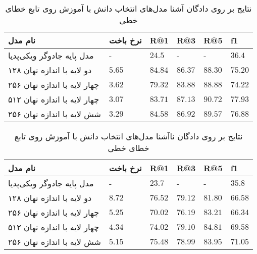 \begin{table}[h]
	\caption{نتایج بر روی دادگان آشنا مدل‌های انتخاب دانش با آموزش روی تابع خطای خطی }
	\centering
	\label{table:knowledge:lin:seen}
	\begin{tabular}{|l|l|l|l|l|l|}
		\hline
		نام مدل                      & نرخ باخت        & R@1              & R@3              & R@5              & f1               \\ \hline
		مدل پایه جادوگر ویکی‌پدیا    & -               & $24.5$           & -                & -                & $36.4$           \\ \hline
		دو لایه با اندازه نهان ۱۲۸   & $5.65$          & $\mathbf{84.84}$ & $86.37$          & $88.30$          & $75.20$          \\ \hline
		چهار لایه با اندازه نهان ۲۵۶ & $3.62$          & $79.32$          & $83.88$          & $88.88$          & $74.22$          \\ \hline
		چهار لایه با اندازه نهان ۵۱۲ & $\mathbf{3.07}$ & $83.71$          & $\mathbf{87.13}$ & $\mathbf{90.72}$ & $\mathbf{77.93}$ \\ \hline
		شش لایه با اندازه نهان ۲۵۶   & $3.29$          & $84.58$          & $86.92$          & $89.57$          & $76.88$          \\ \hline
	\end{tabular}
\end{table}

\begin{table}[h]
	\caption{نتایج بر روی دادگان ناآشنا مدل‌های انتخاب دانش با آموزش روی تابع خطای خطی }
	\centering
	\label{table:knowledge:lin:unseen}
	\begin{tabular}{|l|l|l|l|l|l|}
		\hline
		نام مدل                      & نرخ باخت        & R@1              & R@3              & R@5              & f1               \\ \hline
		مدل پایه جادوگر ویکی‌پدیا    & -               & $23.7$           & -                & -                & $35.8$           \\ \hline
		دو لایه با اندازه نهان ۱۲۸   & $8.72$          & $\mathbf{76.52}$ & $\mathbf{79.12}$ & $81.80$          & $66.58$          \\ \hline
		چهار لایه با اندازه نهان ۲۵۶ & $5.25$          & $70.02$          & $76.19$          & $83.21$          & $66.34$          \\ \hline
		چهار لایه با اندازه نهان ۵۱۲ & $\mathbf{4.34}$ & $74.02$          & $79.10$          & $\mathbf{84.81}$ & $69.58$          \\ \hline
		شش لایه با اندازه نهان ۲۵۶   & $5.15$          & $75.48$          & $78.99$          & $83.95$          & $\mathbf{71.05}$ \\ \hline
	\end{tabular}
\end{table}

